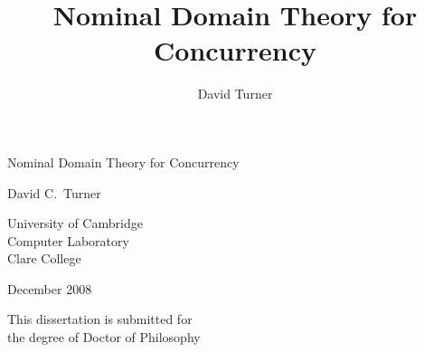 \documentclass[oneside,titlepage,a4paper]{book}
\title{Nominal Domain Theory for Concurrency}
\date{\revisionnumber}
\author{David Turner}
\begin{document}
\begin{titlepage}
\vspace*{1mm}
\begin{center}
\Huge Nominal Domain Theory for Concurrency
\end{center}
\addvspace{20mm}
\begin{center}
\LARGE David C.~Turner
\end{center}
\addvspace{20mm}
\begin{center}
\end{center}
\addvspace{23mm}
\begin{center}
\Large University of Cambridge\\
Computer Laboratory\\
Clare College
\end{center}
\addvspace{15mm}
\begin{center}\Large December 2008\end{center}
\addvspace{15mm}
\begin{center}
This dissertation is submitted for\\
the degree of Doctor of Philosophy
\end{center}
\end{titlepage}
\setcounter{page}{2} %
%
\pagestyle{empty}
\end{document}
